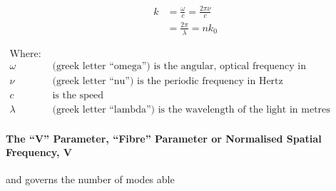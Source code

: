 \documentclass[colorlinks,11pt,a4paper,normalphoto,withhyper,ragged2e]{altareport}
\begin{document}
\begin{paracol}{2}

\medskip

\setlength{\jot}{2ex}
\begin{align}
	k &= \frac{\omega}{c} = \frac{2\pi\nu}{c} \nonumber\\
	&= \frac{2\pi}{\lambda} = nk_0 \nonumber
\end{align}

\switchcolumn

\setlength{\jot}{1ex}
\begin{align}
	\text{Where:}& \nonumber\\
	\omega & \text{ (greek letter ``omega'') is the angular, optical frequency in Radians/Second} \nonumber\\
	\nu & \text{ (greek letter ``nu'') is the periodic frequency in Hertz} \nonumber\\
	c & \text{ is the speed } \nonumber\\
	\lambda & \text{ (greek letter ``lambda'') is the wavelength of the light in metres} \nonumber	
\end{align}

\end{paracol}




\paragraph{The ``V'' Parameter, ``Fibre'' Parameter or Normalised Spatial Frequency, $\textbf{V}$ \linebreak}

 and governs the number of modes able 
\end{document}
